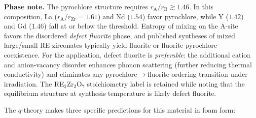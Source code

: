 \documentclass[12pt,letterpaper]{article}
\theoremstyle{definition}
\begin{document}
\textbf{Phase note.}  The pyrochlore structure requires $r_{\mathrm{A}}/r_{\mathrm{B}} \gtrsim 1.46$.  In this composition, La ($r_{\mathrm{A}}/r_{\mathrm{Zr}} = 1.61$) and Nd ($1.54$) favor pyrochlore, while Y ($1.42$) and Gd ($1.46$) fall at or below the threshold.  Entropy of mixing on the A-site favors the disordered \emph{defect fluorite} phase, and published syntheses of mixed large/small RE zirconates typically yield fluorite or fluorite-pyrochlore coexistence.  For the application, defect fluorite is \emph{preferable}: the additional cation and anion-vacancy disorder enhances phonon scattering (further reducing thermal conductivity) and eliminates any pyrochlore$\to$fluorite ordering transition under irradiation.  The RE$_2$Zr$_2$O$_7$ stoichiometry label is retained while noting that the equilibrium structure at synthesis temperature is likely defect fluorite.

The $q$-theory makes three specific predictions for this material in foam form:
\end{document}
